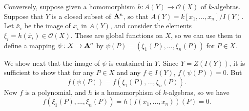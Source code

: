 {Conversely, suppose given a homomorphism $h\colon A(Y)\to\mathcal O(X)$ of $k$-algebras. Suppose that $Y$ is a closed subset of $\AffSpace{n}$, so that $A(Y)=k[x_1,\ldots,x_n]/I(Y)$. Let $\bar x_i$ be the image of $x_i$ in $A(Y)$, and consider the elements $\xi_i=h(\bar x_i)\in\mathcal O(X)$. These are global functions on $X$, so we can use them to define a mapping $\psi\colon X\to\AffSpace{n}$ by $\psi(P)=(\xi_1(P),\ldots,\xi_n(P))$ for $P\in X$.

We show next that the image of $\psi$ is contained in $Y$. Since $Y=Z(I(Y))$, it is sufficient to show that for any $P\in X$ and any $f\in I(Y)$, $f(\psi(P))=0$. But
\[
f(\psi(P))=f(\xi_1(P),\ldots,\xi_n(P)).
\]
Now $f$ is a polynomial, and $h$ is a homomorphism of $k$-algebras, so we have
\[
f(\xi_1(P),\ldots,\xi_n(P))=h(f(\bar x_1,\ldots,\bar x_n))(P)=0.
\]%
}
